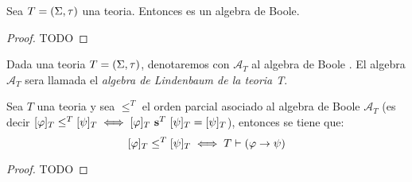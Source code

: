 \begin{theorem}
  Sea $T=(\Sigma,\tau)$ una teoria. Entonces \algLin es un algebra de Boole.
\end{theorem}
\begin{proof}
  TODO
\end{proof}

\begin{definition}
  Dada una teoria $T=(\Sigma,\tau)$, denotaremos con $\mathcal{A}_T$ al algebra de Boole \algLin. El algebra
  $\mathcal{A}_T$ sera llamada el \emph{algebra de Lindenbaum de la teoria T}. 
\end{definition}
\begin{lemma}
  Sea $T$ una teoria y sea $\leq^T$ el orden parcial asociado al algebra de Boole $\mathcal{A}_T$ (es decir $[\varphi]_T\leq^T [\psi]_T  \iff [\varphi]_T\ \mathbf{s}^T\ [\psi]_T=[\psi]_T$),
  entonces se tiene que:
  $$
  [\varphi]_T\leq^T[\psi]_T \iff T\vdash(\varphi\rightarrow\psi)
  $$
\end{lemma}
\begin{proof}
  TODO
\end{proof}
